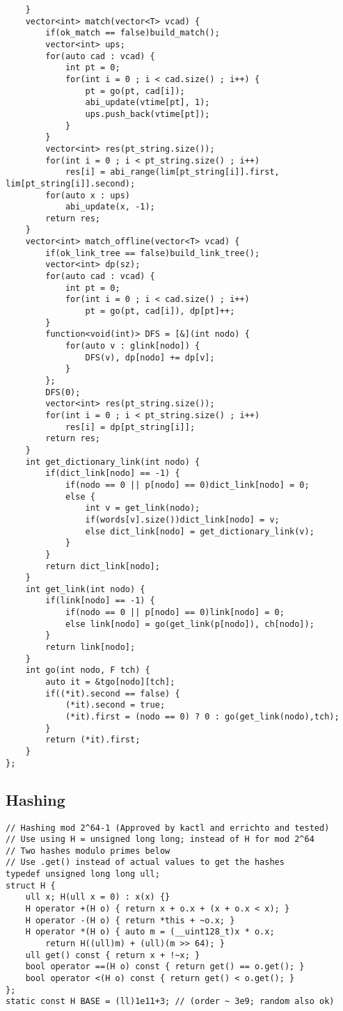 \documentclass[landscape, 8pt, a4paper, oneside]{extarticle}
\begin{document}
\begin{multicols}{3}
\begin{verbatim}
    }
    vector<int> match(vector<T> vcad) {
        if(ok_match == false)build_match();
        vector<int> ups;
        for(auto cad : vcad) {
            int pt = 0;
            for(int i = 0 ; i < cad.size() ; i++) {
                pt = go(pt, cad[i]);
                abi_update(vtime[pt], 1);
                ups.push_back(vtime[pt]);
            }
        }
        vector<int> res(pt_string.size());
        for(int i = 0 ; i < pt_string.size() ; i++)
            res[i] = abi_range(lim[pt_string[i]].first, lim[pt_string[i]].second);
        for(auto x : ups)
            abi_update(x, -1);
        return res;
    }
    vector<int> match_offline(vector<T> vcad) {
        if(ok_link_tree == false)build_link_tree();
        vector<int> dp(sz);
        for(auto cad : vcad) {
            int pt = 0;
            for(int i = 0 ; i < cad.size() ; i++)
                pt = go(pt, cad[i]), dp[pt]++;
        }
        function<void(int)> DFS = [&](int nodo) {
            for(auto v : glink[nodo]) {
                DFS(v), dp[nodo] += dp[v];
            }
        };
        DFS(0);
        vector<int> res(pt_string.size());
        for(int i = 0 ; i < pt_string.size() ; i++)
            res[i] = dp[pt_string[i]];
        return res;
    }
    int get_dictionary_link(int nodo) {
        if(dict_link[nodo] == -1) {
            if(nodo == 0 || p[nodo] == 0)dict_link[nodo] = 0;
            else {
                int v = get_link(nodo);
                if(words[v].size())dict_link[nodo] = v;
                else dict_link[nodo] = get_dictionary_link(v);
            }
        }
        return dict_link[nodo];
    }
    int get_link(int nodo) {
        if(link[nodo] == -1) {
            if(nodo == 0 || p[nodo] == 0)link[nodo] = 0;
            else link[nodo] = go(get_link(p[nodo]), ch[nodo]);
        }
        return link[nodo];
    }
    int go(int nodo, F tch) {
        auto it = &tgo[nodo][tch];
        if((*it).second == false) {
            (*it).second = true;
            (*it).first = (nodo == 0) ? 0 : go(get_link(nodo),tch);
        }
        return (*it).first;
    }
};
\end{verbatim}
\subsection{Hashing}
\begin{verbatim}
// Hashing mod 2^64-1 (Approved by kactl and errichto and tested)
// Use using H = unsigned long long; instead of H for mod 2^64
// Two hashes modulo primes below
// Use .get() instead of actual values to get the hashes
typedef unsigned long long ull;
struct H {
    ull x; H(ull x = 0) : x(x) {}
    H operator +(H o) { return x + o.x + (x + o.x < x); }
    H operator -(H o) { return *this + ~o.x; }
    H operator *(H o) { auto m = (__uint128_t)x * o.x;
        return H((ull)m) + (ull)(m >> 64); }
    ull get() const { return x + !~x; }
    bool operator ==(H o) const { return get() == o.get(); }
    bool operator <(H o) const { return get() < o.get(); }
};
static const H BASE = (ll)1e11+3; // (order ~ 3e9; random also ok)


\end{verbatim}
\end{multicols}
\end{document}
